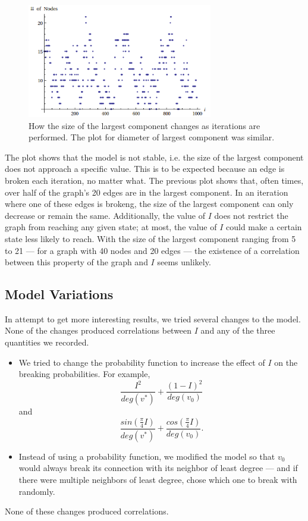\documentclass[a4paper,10pt]{article}
\begin{document}
\begin{figure}[H]
\label{fig:gc-size-iter}
\begin{center}
\includegraphics[height=5cm]{images/gc_size_iter.png}
\caption{How the size of the largest component changes as iterations are performed. The plot for diameter of largest component was similar.}
\end{center}
\end{figure} 
The plot shows that the model is not stable, i.e. the size of the largest component does not approach a specific value. This is to be expected because an edge is broken each iteration, no matter what. The previous plot shows that, often times, over half of the graph's 20 edges are in the largest component. In an iteration where one of these edges is brokeng, the size of the largest component can only decrease or remain the same. Additionally, the value of $I$ does not restrict the graph from reaching any given state; at most, the value of $I$ could make a certain state less likely to reach. With the size of the largest component ranging from 5 to 21 --- for a graph with 40 nodes and 20 edges --- the existence of a correlation between this property of the graph and $I$ seems unlikely.

\subsection{Model Variations}
In attempt to get more interesting results, we tried several changes to the model. None of the changes produced correlations between $I$ and any of the three quantities we recorded.

\begin{itemize}

 \item We tried to change the probability function to increase the effect of $I$ on the breaking probabilities. For example,
 \begin{equation}
  \frac{I^2}{deg(v^*)} + \frac{(1 - I)^2}{deg(v_0)}
 \end{equation}
and
 \begin{equation}
  \frac{sin(\frac{\pi}{4}I)}{deg(v^*)} + \frac{cos(\frac{\pi}{4}I)}{deg(v_0)}.
 \end{equation}

 \item Instead of using a probability function, we modified the model so that $v_0$ would always break its connection with its neighbor of least degree --- and if there were multiple neighbors of least degree, chose which one to break with randomly. 

\end{itemize}
 None of these changes produced correlations.
\end{document}
